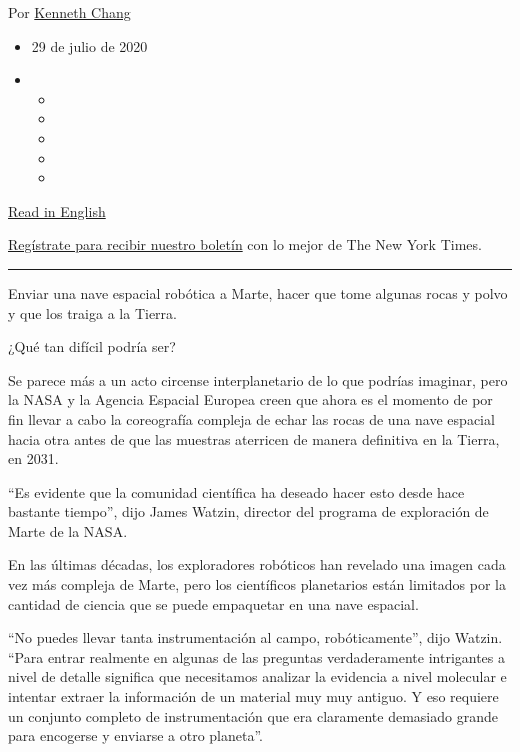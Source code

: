 Por \href{https://www.nytimes.com/by/kenneth-chang}{Kenneth Chang}

\begin{itemize}
\item
  29 de julio de 2020
\item
  \begin{itemize}
  \item
  \item
  \item
  \item
  \item
  \end{itemize}
\end{itemize}

\href{https://www.nytimes.com/2020/07/28/science/mars-sample-return-mission.html}{Read
in English}

\href{https://www.nytimes.com/newsletters/el-times}{Regístrate para
recibir nuestro boletín} con lo mejor de The New York Times.

\begin{center}\rule{0.5\linewidth}{\linethickness}\end{center}

Enviar una nave espacial robótica a Marte, hacer que tome algunas rocas
y polvo y que los traiga a la Tierra.

¿Qué tan difícil podría ser?

Se parece más a un acto circense interplanetario de lo que podrías
imaginar, pero la NASA y la Agencia Espacial Europea creen que ahora es
el momento de por fin llevar a cabo la coreografía compleja de echar las
rocas de una nave espacial hacia otra antes de que las muestras
aterricen de manera definitiva en la Tierra, en 2031.

``Es evidente que la comunidad científica ha deseado hacer esto desde
hace bastante tiempo'', dijo James Watzin, director del programa de
exploración de Marte de la NASA.

En las últimas décadas, los exploradores robóticos han revelado una
imagen cada vez más compleja de Marte, pero los científicos planetarios
están limitados por la cantidad de ciencia que se puede empaquetar en
una nave espacial.

``No puedes llevar tanta instrumentación al campo, robóticamente'', dijo
Watzin. ``Para entrar realmente en algunas de las preguntas
verdaderamente intrigantes a nivel de detalle significa que necesitamos
analizar la evidencia a nivel molecular e intentar extraer la
información de un material muy muy antiguo. Y eso requiere un conjunto
completo de instrumentación que era claramente demasiado grande para
encogerse y enviarse a otro planeta''.

